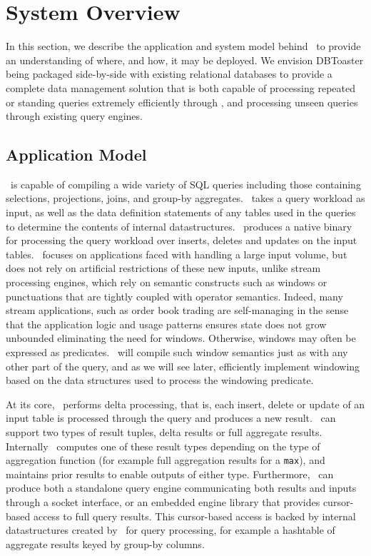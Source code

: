 \section{System Overview}
In this section, we describe the application and system model behind \compiler\
to provide an understanding of where, and how, it may be deployed. We envision
DBToaster being packaged side-by-side with existing relational data\-ba\-ses to
provide a complete data management solution that is both capable of processing
repeated or standing queries extremely efficiently through \compiler, and
processing unseen queries through existing query engines. 

\subsection{Application Model}
\compiler\ is capable of compiling a wide variety of SQL queries including those
containing selections, projections, joins, and group-by aggregates. \compiler\
takes a query workload as input, as well as the data definition statements of any
tables used in the queries to determine the contents of internal datastructures.
\compiler\ produces a native binary for processing the query workload over inserts,
deletes and updates on the input tables. \compiler\ focuses on applications faced
with handling a large input volume, but does not rely on artificial restrictions
of these new inputs, unlike stream processing engines, which rely on semantic
constructs such as windows or punctuations that are tightly coupled with operator
semantics. Indeed, many stream applications, such as order book trading are
self-managing in the sense that the application logic and usage patterns ensures state
does not grow unbounded eliminating the need for windows. Otherwise, windows may
often be expressed as predicates. \compiler\ will compile such window semantics
just as with any other part of the query, and as we will see later, efficiently
implement windowing based on the data structures used to process the windowing
predicate.

At its core, \compiler\ performs delta processing, that is, each insert, delete or
update of an input table is processed through the query and produces a new
result.
\compiler\ can support two types of result tuples, delta results or full
aggregate results. Internally \compiler\ computes one of these result types
depending on the type of aggregation function (for example full aggregation
results for a \texttt{max}), and maintains prior results to enable outputs of
either type. Furthermore, \compiler\ can produce both a standalone query engine
communicating both results and inputs through a socket interface, or an embedded
engine library that provides cursor-based access to full query results. This
cursor-based access is backed by internal datastructures created by \compiler\
for query processing, for example a hashtable of aggregate results keyed by
group-by columns.

